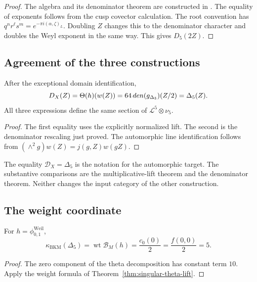\begin{proof}
The algebra and its denominator theorem are constructed in
\cite[\S\S2--4 and \S6]{GN}.
The equality of exponents follows from the cusp covector calculation.
The root convention has
\(q^nr^\ell s^m=e^{-\pi i(\alpha,\zeta)_L}\).
Doubling \(Z\) changes this to the denominator character and doubles
the Weyl exponent in the same way.
This gives \(D_5(2Z)\).
\end{proof}

\subsection{Agreement of the three constructions}
\label{ssec:compat-view-i}

\begin{theorem}
\label{thm:bgn-three-way}
After the exceptional domain identification,
\[
 D_X(Z)=\Theta(h)(w(Z))
 =64\,den({g_{\Delta_5}})(Z/2)=\Delta_5(Z).
\]
All three expressions define the same section of
\(\mathcal L^5\otimes\nu_5\).
\end{theorem}

\begin{proof}
The first equality uses the explicitly normalized lift.
The second is the denominator rescaling just proved.
The automorphic line identification follows from
\((\wedge^2g)w(Z)=j(g,Z)w(gZ)\).
\end{proof}

The equality \(\mathcal D_X=\Delta_5\) is the notation for the
automorphic target.  The substantive comparisons are the
multiplicative-lift theorem and the denominator theorem.
Neither changes the input category of the other construction.

\subsection{The weight coordinate}
\label{ssec:universal-weight-identity}

\begin{theorem}
\label{thm:universal-weight-identity}
For \(h=\phi_{0,1}^{\mathrm{Weil}}\),
\[
 \kappa_{\mathrm{BKM}}(\Delta_5)
 =\operatorname{wt}\mathcal B_M(h)
 =\frac{c_0(0)}2=\frac{f(0,0)}2=5.
\]
\end{theorem}

\begin{proof}
The zero component of the theta decomposition has constant term
\(10\).  Apply the weight formula of
Theorem~\ref{thm:singular-theta-lift}.
\end{proof}


